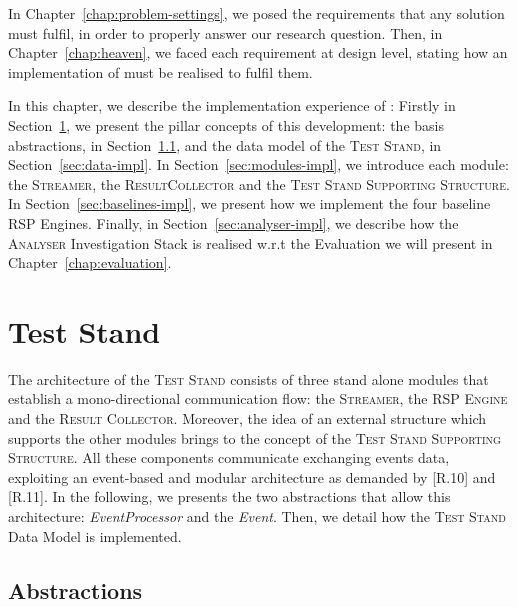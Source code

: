In Chapter~\ref{chap:problem-settings}, we posed the requirements that any solution must fulfil, in order to properly answer our research question. Then, in Chapter~\ref{chap:heaven}, we faced each requirement at design level, stating how an implementation of \name must be realised to fulfil them. 

In this chapter, we describe the implementation experience of \namens: 
Firstly in Section~\ref{sec:test-stand-general}, we present the pillar concepts of this development: the basis abstractions, in Section~\ref{sec:abstractions}, and the data model of the \textsc{Test Stand}, in Section~\ref{sec:data-impl}. In Section~\ref{sec:modules-impl}, we introduce each \name module: the \textsc{Streamer}, the \textsc{ResultCollector} and the \textsc{Test Stand Supporting Structure}. In Section~\ref{sec:baselines-impl}, we present how we implement the four baseline RSP Engines. Finally, in Section~\ref{sec:analyser-impl}, we describe how the \textsc{Analyser} Investigation Stack is realised w.r.t the Evaluation we will present in Chapter~\ref{chap:evaluation}.

\section{Test Stand}\label{sec:test-stand-general}

The architecture of the \textsc{Test Stand} consists of three stand alone modules that establish a mono-directional communication flow: the \textsc{Streamer}, the \textsc{RSP Engine} and the \textsc{Result Collector}. Moreover, the idea of an external structure which supports the other modules brings to the concept of the \textsc{Test Stand Supporting Structure}. All these components communicate exchanging events data, exploiting an event-based and modular architecture as demanded by [R.10] and [R.11]. In the following, we presents the two abstractions that allow this architecture: \textit{EventProcessor} and the \textit{Event}. Then, we detail how the \textsc{Test Stand} Data Model is implemented.

\subsection{Abstractions}\label{sec:abstractions}

